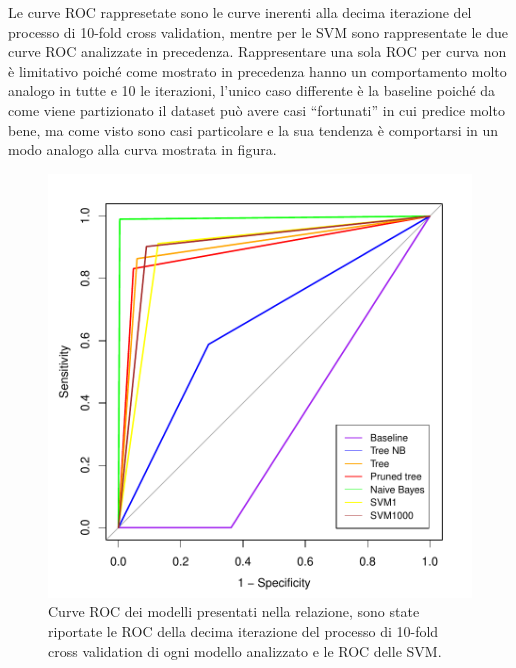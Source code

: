 Le curve ROC rappresetate sono le curve inerenti alla decima iterazione del processo di 10-fold cross validation, mentre per le SVM sono rappresentate le due curve ROC analizzate in precedenza.
Rappresentare una sola ROC per curva non è limitativo poiché come mostrato in precedenza hanno un comportamento molto analogo in tutte e 10 le iterazioni, l'unico caso differente è la baseline poiché da come viene partizionato il dataset può avere casi “fortunati” in cui predice molto bene, ma come visto sono casi particolare e la sua tendenza è comportarsi in un modo analogo alla curva mostrata in figura.
\begin{figure}
	\centering
	\includegraphics[width=0.9\linewidth]{../FinalResults/Images/Mixed2}
	\caption{Curve ROC dei modelli presentati nella relazione, sono state riportate le ROC della decima iterazione del processo di 10-fold cross validation di ogni modello analizzato e le ROC delle SVM.}
	\label{fig:mixed2}
\end{figure}
